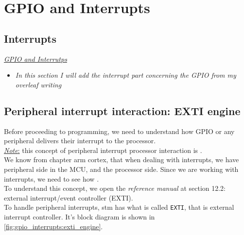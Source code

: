 

\chapter{GPIO and Interrupts}

\section{Interrupts}

 \underline{\textit{GPIO and Interrutps}} 

\begin{itemize}

\item \textit{In this section I will add the interrupt part concerning the GPIO from my overleaf writing}

\end{itemize}

\section{Peripheral interrupt interaction: EXTI engine}

Before proceeding to programming, we need to understand how GPIO or any peripheral delivers their interrupt to the processor. \\

\underline{\textit{Note}:} this concept of peripheral interrupt processor interaction is .\\

We know from chapter arm cortex, that when dealing with interrupts, we have peripheral side in the MCU, and the processor side. Since we are working with interrupts, we need to see how .\\

To understand this concept, we open the \textit{reference manual} at section 12.2: external interrupt/event controller (EXTI).\\

\newpage
To handle peripheral interrupts, stm has what is called 
\verb|EXTI|, that is external interrupt controller. It's block diagram is shown in \autoref{fig:gpio_interrupts:exti_engine}.


